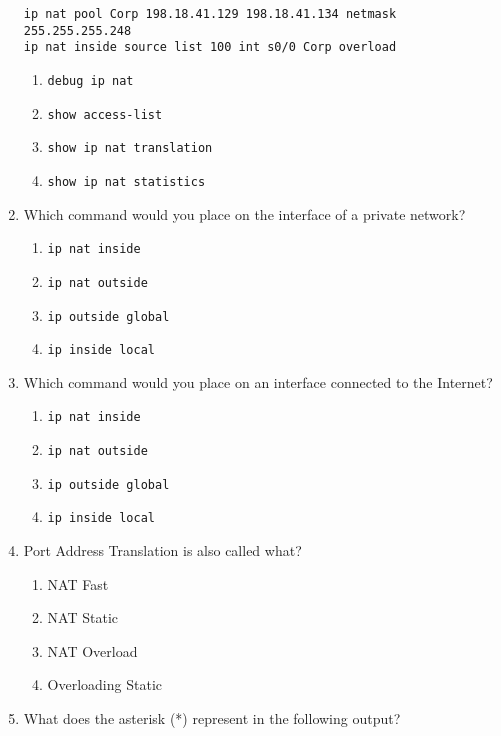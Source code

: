 \begin{enumerate}
\begin{verbatim}
ip nat pool Corp 198.18.41.129 198.18.41.134 netmask 255.255.255.248
ip nat inside source list 100 int s0/0 Corp overload
\end{verbatim}

  \begin{enumerate}
  \tightlist
  \item
    \texttt{debug\ ip\ nat}
  \item
    \texttt{show\ access-list}
  \item
    \texttt{show\ ip\ nat\ translation}
  \item
    \texttt{show\ ip\ nat\ statistics}
  \end{enumerate}
\item
  Which command would
  you place on the interface of a private network?

  \begin{enumerate}
  \tightlist
  \item
    \texttt{ip\ nat\ inside}
  \item
    \texttt{ip\ nat\ outside}
  \item
    \texttt{ip\ outside\ global}
  \item
    \texttt{ip\ inside\ local}
  \end{enumerate}
\item
  Which command would you place on an interface connected to the
  Internet?

  \begin{enumerate}
  \tightlist
  \item
    \texttt{ip\ nat\ inside}
  \item
    \texttt{ip\ nat\ outside}
  \item
    \texttt{ip\ outside\ global}
  \item
    \texttt{ip\ inside\ local}
  \end{enumerate}
\item
  Port Address Translation is also called what?

  \begin{enumerate}
  \tightlist
  \item
    NAT Fast
  \item
    NAT Static
  \item
    NAT Overload
  \item
    Overloading Static
  \end{enumerate}
\item
  What does the asterisk (*) represent in the following output?


\end{enumerate}
